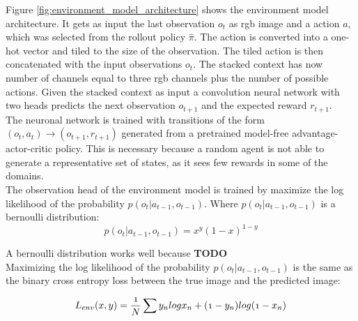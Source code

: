 Figure \ref{fig:environment_model_architecture} shows the environment model architecture.
It gets as input the last observation $o_t$ as rgb image and a action $a$, which was selected from the rollout policy $\hat{\pi}$. The action is converted into a one-hot vector and tiled to the size of the observation.
The tiled action is then concatenated with the input observations $o_t$.
The stacked context has now number of channels equal to three rgb channels plus the number of possible actions.
Given the stacked context as input a convolution neural network with two heads predicts the next observation $o_{t+1}$ and the expected reward $r_{t+1}$.\\

The neuronal network is trained with transitions of the form $(o_t, a_t) \rightarrow (o_{t+1}, r_{t+1})$ generated from a pretrained model-free advantage-actor-critic policy. This is necessary because a random agent is not able to generate a representative set of states, as it sees few rewards in some of the domains.\\

 
The observation head of the environment model is trained by maximize the log likelihood of the probability $p(o_t | a_{t-1}, o_{t-1})$.
Where $p(o_t | a_{t-1}, o_{t-1})$ is a bernoulli distribution: 
\begin{equation} 
   p(o_t | a_{t-1}, o_{t-1}) = x^y (1-x)^{1-y} 
\end{equation}

A bernoulli distribution works well because \textbf{TODO}\\

   
Maximizing the log likelihood of the probability $p(o_t | a_{t-1}, o_{t-1})$ is the same as the binary cross entropy loss between the true image and the predicted image:

   
\begin{equation} 
  \mathnormal{ 
  L_{env}(x, y) = \frac{1}{N} \sum y_n log x_n + (1-y_n) log(1- x_n) 
  } 
\end{equation}

